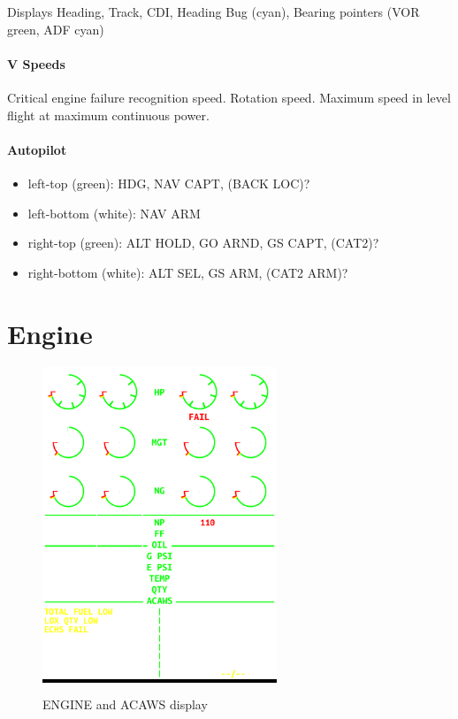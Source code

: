 Displays Heading, Track, \gls{CDI}, Heading Bug (cyan), Bearing pointers (VOR green, ADF cyan)

\paragraph*{V Speeds}

\begin{itemize}
   Critical engine failure recognition speed.
   Rotation speed.
   Maximum speed in level flight at maximum continuous power.
\end{itemize}

\paragraph*{Autopilot}

\begin{itemize}
  \item left-top (green): HDG, NAV CAPT, (BACK LOC)?
  \item left-bottom (white): NAV ARM

  \item right-top (green): ALT HOLD, GO ARND, GS CAPT, (CAT2)?
  \item right-bottom (white): ALT SEL, GS ARM, (CAT2 ARM)?
\end{itemize}

\newpage
\section{Engine}

\begin{figure}[h]
  \centering
  \colorbox{black}{\includegraphics[width=7cm]{figures/hdd/EICAS}}
  \caption{ENGINE and ACAWS display}
\end{figure}

